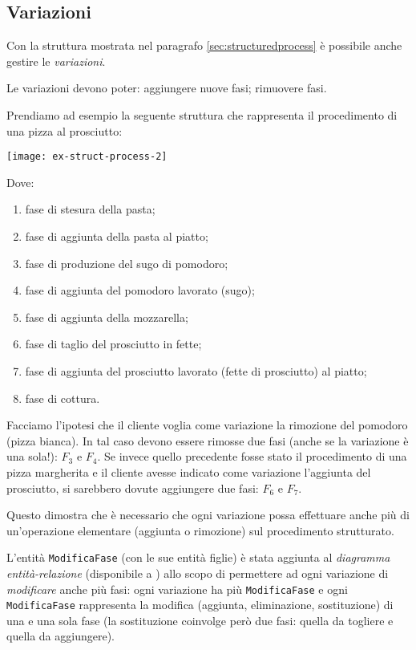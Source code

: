 \subsection{Variazioni}
Con la struttura mostrata nel paragrafo \vref{sec:structuredprocess} è possibile anche
gestire le {\it variazioni}.

Le variazioni devono poter: aggiungere nuove fasi; rimuovere fasi.

Prendiamo ad esempio la seguente struttura che rappresenta il procedimento di una
pizza al prosciutto:

\vspace{5pt}\centerline{\texttt{[image: ex-struct-process-2]}}

\vspace{15pt}

Dove:
\begin{enumerate}[label=$F_{\arabic*}$:]
    \item fase di stesura della pasta;
    \item fase di aggiunta della pasta al piatto;
    \item fase di produzione del sugo di pomodoro;
    \item fase di aggiunta del pomodoro lavorato (sugo);
    \item fase di aggiunta della mozzarella;
    \item fase di taglio del prosciutto in fette;
    \item fase di aggiunta del prosciutto lavorato (fette di prosciutto) al piatto;
    \item fase di cottura.
\end{enumerate}

Facciamo l'ipotesi che il cliente voglia come variazione la rimozione del pomodoro
(pizza bianca). In tal caso devono essere rimosse due fasi (anche se la variazione è
una sola!): $F_{3}$ e $F_{4}$. Se invece quello precedente fosse stato il procedimento
di una pizza margherita e il cliente avesse indicato come variazione l'aggiunta del
prosciutto, si sarebbero dovute aggiungere due fasi: $F_{6}$ e $F_{7}$.

Questo dimostra che è necessario che ogni variazione possa effettuare anche più di un'operazione
elementare (aggiunta o rimozione) sul procedimento strutturato.

L'entità {\tt ModificaFase} (con le sue entità figlie) è stata aggiunta al {\it diagramma
entità-relazione} (disponibile a ) allo scopo di permettere
ad ogni variazione di {\it modificare} anche più fasi: ogni variazione ha più
{\tt ModificaFase} e ogni {\tt ModificaFase} rappresenta la modifica (aggiunta, eliminazione, sostituzione)
di una e una sola fase (la sostituzione coinvolge però due fasi: quella da togliere e quella da aggiungere).


